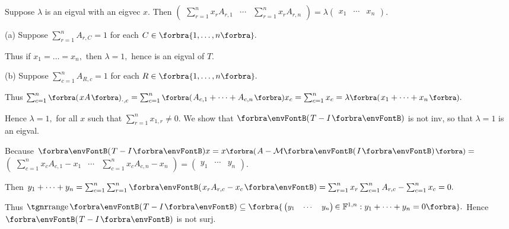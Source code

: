 \documentclass[a4paper, 11pt, UTF8]{article}
\begin{document}
\begin{large}
\par\quad
Suppose $\lambda$ is an eigval with an eigvec $x.$ Then {\normalsize$\begin{pmatrix} \sum_{r=1}^n x_r A_{r,1} &\cdots & \sum_{r=1}^n x_r A_{r,n}\end{pmatrix}$}${}=\lambda${\normalsize$\begin{pmatrix} x_1 & \cdots & x_n\end{pmatrix}$}.\vspace{4pt}\par\quad
(a) Suppose $\sum_{r=1}^n A_{r,C}=1$ for each $C\in\Bra{1,\dots,n}.$\par\quad\Ha
Thus if $x_1=\dots=x_n,$ then $\lambda=1,$ hence is an eigval of $T.$\vspace{4pt}\par\quad
(b) Suppose $\sum_{c=1}^n A_{R,c}=1$ for each $R\in\Bra{1,\dots,n}.$\vspace{2pt}\par\quad\Hb
Thus $\sum_{c=1}^n \BigPar{xA}_{\cdot,c}=\sum_{c=1}^n\BigPar{A_{c,1}+\dots+A_{c,n}}x_c=\sum_{c=1}^n x_c=\lambda\BigPar{x_1+\dots+x_n}.$\vspace{2pt}\par\quad\Hb
Hence $\lambda=1,$ for all $x$ such that $\sum_{r=1}^n x_{1,r}\neq 0.$\PfEnd\vspace{6pt}\quad\Hb
\Or We show that $\Par{T-I}$ is not inv, so that $\lambda=1$ is an eigval.\par\quad\Hb
Because $\Par{T-I}x=x\BigPar{A-\Mt{I}}={}${\normalsize$\begin{pmatrix} \sum_{c=1}^n x_c A_{c,1}-x_1 &\cdots & \sum_{c=1}^n x_c A_{c,n}-x_n\end{pmatrix}$}${}={}${\normalsize$\begin{pmatrix} y_1 & \cdots & y_n\end{pmatrix}$}.\vspace{2pt}\par\quad\Hb
Then $y_1+\dots+y_n=\sum_{c=1}^n\sum_{r=1}^n\Par{x_r A_{r,c}-x_c}=\sum_{r=1}^n x_r\sum_{c=1}^n A_{r,c}-\sum_{c=1}^n x_c=0.$\par\vspace{4pt}\quad\Hb
Thus $\range\Par{T-I}\subseteq\Bra{\,${\small$\begin{pmatrix}y_1 & \cdots & y_n\end{pmatrix}$}$\,\in\Fbb^{1,n}:y_1+\dots+y_n=0}.$ Hence $\Par{T-I}$ is not surj.\PfEnd\vspace{6pt}\quad\Hb

\end{large}
\end{document}
